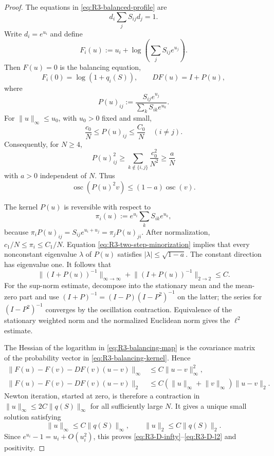 \documentclass[11pt]{article}
\theoremstyle{definition}
\theoremstyle{remark}
\newcommand{\norm}[1]{\lVert #1\rVert}
\begin{document}
\begin{proof}
The equations in \eqref{eq:R3-balanced-profile} are
\[
 d_i\sum_jS_{ij}d_j=1.
\]
Write \(d_i=e^{u_i}\) and define
\begin{equation}\label{eq:R3-balancing-map}
 F_i(u):=u_i+\log\left(\sum_jS_{ij}e^{u_j}\right).
\end{equation}
Then \(F(u)=0\) is the balancing equation,
\[
 F_i(0)=\log(1+q_i(S)),
 \qquad
 DF(u)=I+P(u),
\]
where
\begin{equation}\label{eq:R3-balancing-kernel}
 P(u)_{ij}:=
 \frac{S_{ij}e^{u_j}}{\sum_kS_{ik}e^{u_k}}.
\end{equation}
For \(\norm u_\infty\le u_0\), with \(u_0>0\) fixed and small,
\[
 \frac{c_0}{N}\le P(u)_{ij}\le\frac{C_0}{N}\quad(i\ne j).
\]
Consequently, for \(N\ge4\),
\begin{equation}\label{eq:R3-two-step-minorization}
 P(u)^2_{ij}
 \ge\sum_{k\notin\{i,j\}}\frac{c_0^2}{N^2}
 \ge\frac aN
\end{equation}
with \(a>0\) independent of \(N\).  Thus
\[
 \operatorname{osc}(P(u)^2v)
 \le(1-a)\operatorname{osc}(v).
\]

The kernel \(P(u)\) is reversible with respect to
\[
 \pi_i(u):=e^{u_i}\sum_kS_{ik}e^{u_k},
\]
because
\(\pi_iP(u)_{ij}=S_{ij}e^{u_i+u_j}=\pi_jP(u)_{ji}\).
After normalization, \(c_1/N\le\pi_i\le C_1/N\).
Equation \eqref{eq:R3-two-step-minorization} implies that every nonconstant
eigenvalue \(\lambda\) of \(P(u)\) satisfies
\(|\lambda|\le\sqrt{1-a}\).  The constant direction has eigenvalue one.
It follows that
\begin{equation}\label{eq:R3-balancing-inverse}
 \norm{(I+P(u))^{-1}}_{\infty\to\infty}
 +\norm{(I+P(u))^{-1}}_{2\to2}\le C.
\end{equation}
For the sup-norm estimate, decompose into the stationary mean and the
mean-zero part and use
\((I+P)^{-1}=(I-P)(I-P^2)^{-1}\) on the latter; the series for
\((I-P^2)^{-1}\) converges by the oscillation contraction.  Equivalence of
the stationary weighted norm and the normalized Euclidean norm gives the
\(\ell^2\) estimate.

The Hessian of the logarithm in \eqref{eq:R3-balancing-map} is the covariance
matrix of the probability vector in \eqref{eq:R3-balancing-kernel}.  Hence
\begin{align*}
 \norm{F(u)-F(v)-DF(v)(u-v)}_\infty
 &\le C\norm{u-v}_\infty^2,\\
 \norm{F(u)-F(v)-DF(v)(u-v)}_2
 &\le C(\norm u_\infty+\norm v_\infty)\norm{u-v}_2.
\end{align*}
Newton iteration, started at zero, is therefore a contraction in
\(\norm u_\infty\le2C\norm{q(S)}_\infty\) for all sufficiently large \(N\).
It gives a unique small solution satisfying
\[
 \norm u_\infty\le C\norm{q(S)}_\infty,
 \qquad
 \norm u_2\le C\norm{q(S)}_2.
\]
Since \(e^{u_i}-1=u_i+O(u_i^2)\), this proves
\eqref{eq:R3-D-infty}--\eqref{eq:R3-D-l2} and positivity.


\end{proof}
\end{document}
